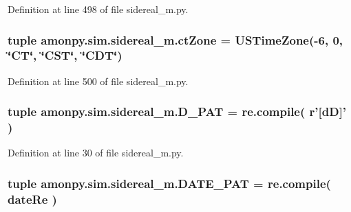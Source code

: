 Definition at line 498 of file sidereal\-\_\-m.\-py.

\hypertarget{namespaceamonpy_1_1sim_1_1sidereal__m_a71f74fd0baa93de2e3a874ebc8ed61d3}{
\subsubsection[{ct\-Zone}]{\setlength{\rightskip}{0pt plus 5cm}tuple amonpy.\-sim.\-sidereal\-\_\-m.\-ct\-Zone = {\bf U\-S\-Time\-Zone}(-\/6, 0, \char`\"{}C\-T\char`\"{}, \char`\"{}C\-S\-T\char`\"{}, \char`\"{}C\-D\-T\char`\"{})}}\label{namespaceamonpy_1_1sim_1_1sidereal__m_a71f74fd0baa93de2e3a874ebc8ed61d3}


Definition at line 500 of file sidereal\-\_\-m.\-py.

\hypertarget{namespaceamonpy_1_1sim_1_1sidereal__m_a36dded2ae7c61bb0bcf6060b1e3d62e7}{
\subsubsection[{D\-\_\-\-P\-A\-T}]{\setlength{\rightskip}{0pt plus 5cm}tuple amonpy.\-sim.\-sidereal\-\_\-m.\-D\-\_\-\-P\-A\-T = re.\-compile( r'\mbox{[}d\-D\mbox{]}' )}}\label{namespaceamonpy_1_1sim_1_1sidereal__m_a36dded2ae7c61bb0bcf6060b1e3d62e7}


Definition at line 30 of file sidereal\-\_\-m.\-py.

\hypertarget{namespaceamonpy_1_1sim_1_1sidereal__m_a1c0ec014abae8082035b7a0335ca4e5d}{
\subsubsection[{D\-A\-T\-E\-\_\-\-P\-A\-T}]{\setlength{\rightskip}{0pt plus 5cm}tuple amonpy.\-sim.\-sidereal\-\_\-m.\-D\-A\-T\-E\-\_\-\-P\-A\-T = re.\-compile( {\bf date\-Re} )}}\label{namespaceamonpy_1_1sim_1_1sidereal__m_a1c0ec014abae8082035b7a0335ca4e5d}


